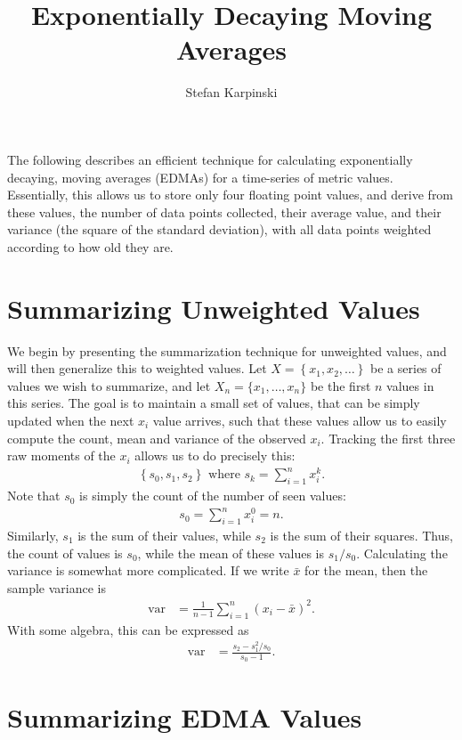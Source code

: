 \documentclass{article}
\title{Exponentially Decaying Moving Averages}
\author{Stefan Karpinski}
\DeclareMathOperator{\var}{var}
\begin{document}
\maketitle

The following describes an efficient technique for calculating exponentially decaying, moving averages (EDMAs) for a time-series of metric values. Essentially, this allows us to store only four floating point values, and derive from these values, the number of data points collected, their average value, and their variance (the square of the standard deviation), with all data points weighted according to how old they are.

\section{Summarizing Unweighted Values}

We begin by presenting the summarization technique for unweighted values, and will then generalize this to weighted values. Let $X=\left\{x_1,x_2,\dots\right\}$ be a series of values we wish to summarize, and let $X_n=\{x_1,\dots,x_n\}$ be the first $n$ values in this series. The goal is to maintain a small set of values, that can be simply updated when the next $x_i$ value arrives, such that these values allow us to easily compute the count, mean and variance of the observed $x_i$. Tracking the first three raw moments of the $x_i$ allows us to do precisely this:
\begin{align}
\left\{s_0, s_1, s_2\right\} \text{ where } s_k = \sum_{i=1}^{n}{x_i^k}.
\end{align}
Note that $s_0$ is simply the count of the number of seen values:
\begin{align}
s_0 = \sum_{i=1}^{n}{x_i^0} = n.
\end{align}
Similarly, $s_1$ is the sum of their values, while $s_2$ is the sum of their squares. Thus, the count of values is $s_0$, while the mean of these values is $s_1/s_0$. Calculating the variance is somewhat more complicated. If we write $\bar{x}$ for the mean, then the sample variance is
\begin{align}
\var &= \frac{1}{n-1} \sum_{i=1}^{n}(x_i-\bar{x})^2.
\end{align}
With some algebra, this can be expressed as
\begin{align}
\var &= \frac{s_2 - s_1^2/s_0}{s_0-1}.
\end{align}

\section{Summarizing EDMA Values}\label{sec:summarization-edma}
\end{document}
